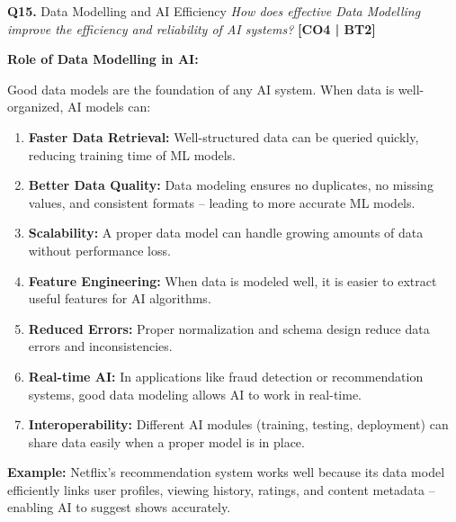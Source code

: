 \documentclass[12pt,a4paper]{article}
\newcommand{\Qno}[1]{\textbf{\color{darkred}Q#1.}}
\newcommand{\term}[1]{\textbf{\color{headingcolor}#1}}
\begin{document}
\vspace{8pt}

\begin{questionbox}{\Qno{15} Data Modelling and AI Efficiency}
\textit{How does effective Data Modelling improve the efficiency and reliability of AI systems?} \hfill \textbf{[CO4 | BT2]}
\end{questionbox}

\begin{answerenv}

\textbf{\color{headingcolor}Role of Data Modelling in AI:}

Good data models are the foundation of any AI system. When data is well-organized, AI models can:

\begin{enumerate}[leftmargin=1.8em, itemsep=5pt]
  \item \term{Faster Data Retrieval:} Well-structured data can be queried quickly, reducing training time of ML models.

  \item \term{Better Data Quality:} Data modeling ensures no duplicates, no missing values, and consistent formats -- leading to more accurate ML models.

  \item \term{Scalability:} A proper data model can handle growing amounts of data without performance loss.

  \item \term{Feature Engineering:} When data is modeled well, it is easier to extract useful features for AI algorithms.

  \item \term{Reduced Errors:} Proper normalization and schema design reduce data errors and inconsistencies.

  \item \term{Real-time AI:} In applications like fraud detection or recommendation systems, good data modeling allows AI to work in real-time.

  \item \term{Interoperability:} Different AI modules (training, testing, deployment) can share data easily when a proper model is in place.
\end{enumerate}

\begin{keypoint}
\textbf{Example:} Netflix's recommendation system works well because its data model efficiently links user profiles, viewing history, ratings, and content metadata -- enabling AI to suggest shows accurately.
\end{keypoint}

\end{answerenv}
\end{document}
